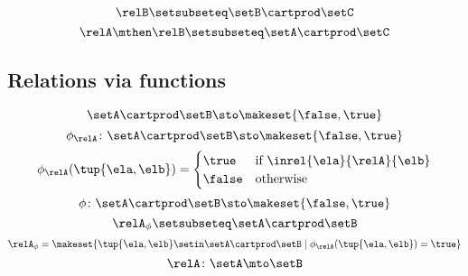 \begin{forslides}
    \begin{equation}
        \label{eq:slides_session2_rel_108}
        \relB \setsubseteq \setB \cartprod \setC
    \end{equation}
    \begin{equation}
        \label{eq:slides_session2_rel_109}
        \relA \mthen \relB \setsubseteq \setA \cartprod \setC
    \end{equation}

    \subsection{Relations via functions}

    \begin{equation}
        \label{eq:slides_session2_rel_110}
        \setA \cartprod \setB \sto \makeset{ \false, \true }
    \end{equation}
    \begin{equation}
        \label{eq:slides_session2_rel_111}
        \phi_{\relA} \colon \setA \cartprod \setB \sto \makeset{ \false, \true }
    \end{equation}
    \begin{equation}
        \label{eq:slides_session2_rel_112}
        \phi_{\relA}(\tup{\ela, \elb}) =
        \begin{cases}
            \true  & \text{if } \inrel{\ela}{\relA}{\elb} \\
            \false & \text{otherwise}
        \end{cases}
    \end{equation}
    \begin{equation}
        \label{eq:slides_session2_rel_113}
        \phi\colon \setA \cartprod \setB \sto \makeset{ \false, \true }
    \end{equation}
    \begin{equation}
        \label{eq:slides_session2_rel_114}
        \relA_{\phi} \setsubseteq \setA \cartprod \setB
    \end{equation}
    \begin{equation}
        \label{eq:slides_session2_rel_115}
        \relA_{\phi} = \makeset{ \tup{\ela, \elb} \setin \setA \cartprod \setB \mid \phi_{\relA}(\tup{\ela, \elb}) = \true }
    \end{equation}
    \begin{equation}
        \label{eq:slides_session2_rel_116}
        \relA \colon \setA \mto \setB
    \end{equation}
    \begin{equation}

\end{equation}
\end{forslides}
